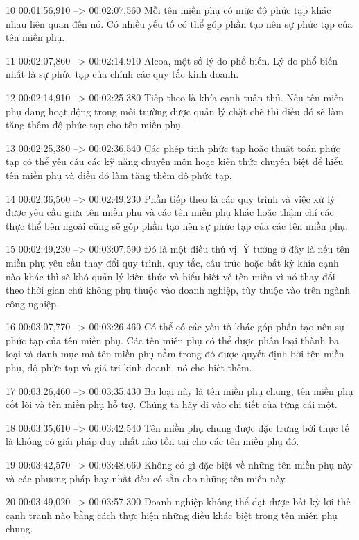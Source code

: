 10
00:01:56,910 --> 00:02:07,560
Mỗi tên miền phụ có mức độ phức tạp khác nhau liên quan đến nó.  Có nhiều yếu tố có thể góp phần tạo nên sự phức tạp của tên miền phụ.

11
00:02:07,860 --> 00:02:14,910
Alcoa, một số lý do phổ biến.  Lý do phổ biến nhất là sự phức tạp của chính các quy tắc kinh doanh.

12
00:02:14,910 --> 00:02:25,380
Tiếp theo là khía cạnh tuân thủ.  Nếu tên miền phụ đang hoạt động trong môi trường được quản lý chặt chẽ thì điều đó sẽ làm tăng thêm độ phức tạp cho tên miền phụ.

13
00:02:25,380 --> 00:02:36,540
Các phép tính phức tạp hoặc thuật toán phức tạp có thể yêu cầu các kỹ năng chuyên môn hoặc kiến ​​thức chuyên biệt để hiểu tên miền phụ và điều đó làm tăng thêm độ phức tạp.

14
00:02:36,560 --> 00:02:49,230
Phần tiếp theo là các quy trình và việc xử lý được yêu cầu giữa tên miền phụ và các tên miền phụ khác hoặc thậm chí các thực thể bên ngoài cũng sẽ góp phần tạo nên sự phức tạp của các tên miền phụ.

15
00:02:49,230 --> 00:03:07,590
Đó là một điều thú vị.  Ý tưởng ở đây là nếu tên miền phụ yêu cầu thay đổi quy trình, quy tắc, cấu trúc hoặc bất kỳ khía cạnh nào khác thì sẽ khó quản lý kiến ​​thức và hiểu biết về tên miền vì nó thay đổi theo thời gian chứ không phụ thuộc vào doanh nghiệp, tùy thuộc vào  trên ngành công nghiệp.

16
00:03:07,770 --> 00:03:26,460
Có thể có các yếu tố khác góp phần tạo nên sự phức tạp của tên miền phụ.  Các tên miền phụ có thể được phân loại thành ba loại và danh mục mà tên miền phụ nằm trong đó được quyết định bởi tên miền phụ, độ phức tạp và giá trị kinh doanh, nó cho biết thêm.

17
00:03:26,460 --> 00:03:35,430
Ba loại này là tên miền phụ chung, tên miền phụ cốt lõi và tên miền phụ hỗ trợ.  Chúng ta hãy đi vào chi tiết của từng cái một.

18
00:03:35,610 --> 00:03:42,540
Tên miền phụ chung được đặc trưng bởi thực tế là không có giải pháp duy nhất nào tồn tại cho các tên miền phụ đó.

19
00:03:42,570 --> 00:03:48,660
Không có gì đặc biệt về những tên miền phụ này và các phương pháp hay nhất đều có sẵn cho những tên miền này.

20
00:03:49,020 --> 00:03:57,300
Doanh nghiệp không thể đạt được bất kỳ lợi thế cạnh tranh nào bằng cách thực hiện những điều khác biệt trong tên miền phụ chung.

